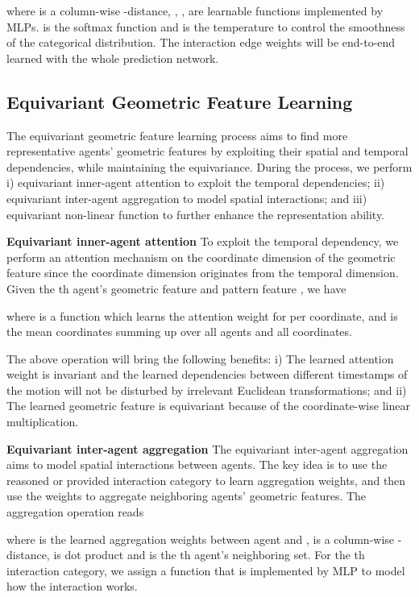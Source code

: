\documentclass[10pt,twocolumn,letterpaper]{article}
\begin{document}
where  is a column-wise -distance, , ,  are learnable functions implemented by MLPs.  is the softmax function and  is the temperature to control the smoothness of the categorical distribution. The interaction edge weights  will be end-to-end learned with the whole prediction network. 


\subsection{Equivariant Geometric Feature Learning}
\label{sec:geo update}
\vspace{-1mm}
The equivariant geometric feature learning process aims to find more representative agents' geometric features by exploiting their spatial and temporal dependencies, while maintaining the equivariance. 
During the process, we perform i) equivariant inner-agent attention to exploit the temporal dependencies; ii) equivariant inter-agent aggregation to model spatial interactions; and iii) equivariant non-linear function to further enhance the representation ability.


\textbf{Equivariant inner-agent attention}
To exploit the temporal dependency, we perform an attention mechanism on the coordinate dimension of the geometric feature since the coordinate dimension originates from the temporal dimension. 
Given the th agent's geometric feature  and pattern feature , we have  

where  is a function which learns the attention weight for per coordinate, and  is the mean coordinates summing up over all agents and all coordinates. 


The above operation will bring the following benefits: i) The learned attention weight is invariant and the learned dependencies between different timestamps of the motion will not be disturbed by irrelevant Euclidean transformations; and ii) The learned geometric feature is equivariant because of the coordinate-wise linear multiplication.  

\textbf{Equivariant inter-agent aggregation}
The equivariant inter-agent aggregation aims to model spatial interactions between agents. The key idea is to use the reasoned or provided interaction category to learn aggregation weights, and then use the weights to aggregate neighboring agents' geometric features. The aggregation operation reads

where  is the learned aggregation weights between agent  and ,  is a column-wise -distance,  is dot product and  is the th agent's neighboring set. For the th interaction category, we assign a function  that is implemented by MLP to model how the interaction works. 
\end{document}
